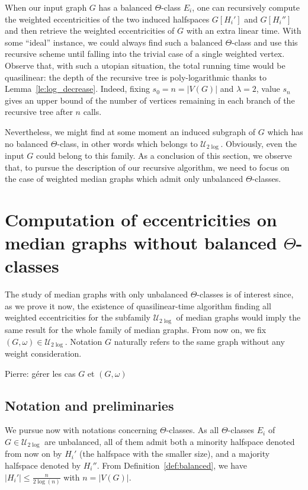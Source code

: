 \documentclass[11pt,letterpaper]{article}
\newcommand{\ulog}{\mathcal{U}_{2\log}}
\newcommand{\PB}[1]{{\color{orange} Pierre: #1}}
\begin{document}
When our input graph $G$ has a balanced $\Theta$-class $E_i$, one can recursively compute the weighted eccentricities of the two induced halfspaces $G[H_i']$ and $G[H_i'']$ and then retrieve the weighted eccentricities of $G$ with an extra linear time. With some ``ideal'' instance, we could always find such a balanced $\Theta$-class and use this recursive scheme until falling into the trivial case of a single weighted vertex. Observe that, with such a utopian situation, the total running time would be quasilinear: the depth of the recursive tree is poly-logarithmic thanks to Lemma~\ref{le:log_decrease}. Indeed, fixing $s_0=n=\vert V(G) \vert$ and $\lambda  = 2$, value $s_n$ gives an upper bound of the number of vertices remaining in each branch of the recursive tree after $n$ calls. 

Nevertheless, we might find at some moment an induced subgraph of $G$ which has no balanced $\Theta$-class, in other words which belongs to $\ulog$. Obviously, even the input $G$ could belong to this family. As a conclusion of this section, we observe that, to pursue the description of our recursive algorithm, we need to focus on the case of weighted median graphs which admit only unbalanced $\Theta$-classes.

\section{Computation of eccentricities on median graphs without balanced $\Theta$-classes} \label{sec:unbalanced}

The study of median graphs with only unbalanced $\Theta$-classes is of interest since, as we prove it now, the existence of quasilinear-time algorithm finding all weighted eccentricities for the subfamily $\ulog$ of median graphs would imply the same result for the whole family of median graphs. From now on, we fix $(G,\omega) \in \ulog$. Notation $G$ naturally refers to the same graph without any weight consideration.

\PB{gérer les cas $G$ et $(G,\omega)$}

\subsection{Notation and preliminaries}

We pursue now with notations concerning $\Theta$-classes. As all $\Theta$-classes $E_i$ of $G \in \ulog$ are unbalanced, all of them admit both a minority halfspace denoted from now on by $H_i'$ (the halfspace with the smaller size), and a majority halfspace denoted by $H_i''$. From Definition~\ref{def:balanced}, we have $\vert H_i' \vert \le \frac{n}{2\log(n)}$ with $n = \vert V(G) \vert$. 
\end{document}

